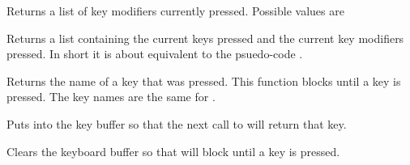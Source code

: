 \newline
{}\newline
{}\newline
{}\newline
{}\newline
{}\newline
{}\newline
{}\newline
{}\newline
{}\newline
{}\newline
{}\newline


Returns a list of key modifiers currently pressed. Possible values are

\newline
{}\newline
{}\newline
{}\newline
{}\newline
{}\newline
{}\newline
{}\newline
{}\newline
{}\newline
{}\newline
{}\newline
{}\newline
{}\newline
{}\newline


Returns a list containing the current keys pressed and the current key modifiers pressed. In short it is about equivalent to the psuedo-code .


Returns the name of a key that was pressed. This function blocks until a key is pressed. The key names are the same for .


Puts  into the key buffer so that the next call to  will return that key.


Clears the keyboard buffer so that  will block until a key is pressed.


